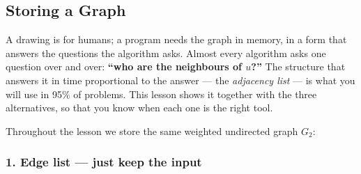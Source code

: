 \subsection{Storing a Graph}
\label{ssec:ch1-storing}

A drawing is for humans; a program needs the graph in memory, in a form that answers the questions the algorithm asks. Almost every algorithm asks one question over and over: \textbf{``who are the neighbours of $u$?''} The structure that answers it in time proportional to the answer --- the \emph{adjacency list} --- is what you will use in 95\% of problems. This lesson shows it together with the three alternatives, so that you know when each one is the right tool.

Throughout the lesson we store the same weighted undirected graph $G_2$:

\begin{diagrambox}
\end{diagrambox}

\subsubsection*{1. Edge list --- just keep the input}

